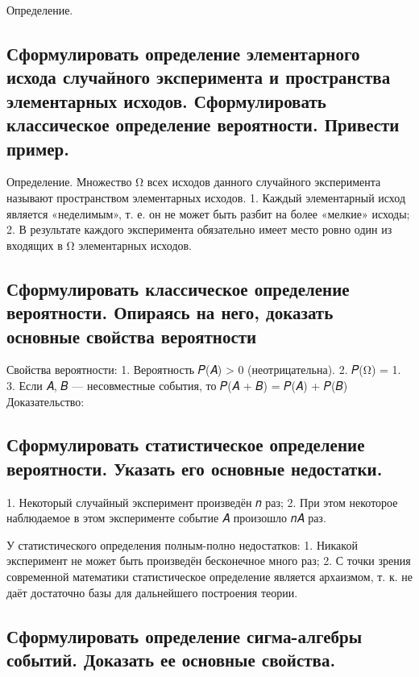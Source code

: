 Определение. 

\subsection{Сформулировать определение элементарного исхода случайного эксперимента и пространства элементарных исходов. Сформулировать классическое определение вероятности. Привести пример.}

Определение. Множество Ω всех исходов данного случайного эксперимента называют пространством элементарных исходов. 
1. Каждый элементарный исход является «неделимым», т. е. он не может быть разбит на более «мелкие» исходы; 
2. В результате каждого эксперимента обязательно имеет место ровно один из входящих в Ω элементарных исходов.

\subsection{Сформулировать классическое определение вероятности. Опираясь на него, доказать основные свойства вероятности}

Свойства вероятности:
1. Вероятность 𝑃(𝐴) > 0 (неотрицательна). 
2. 𝑃(Ω) = 1. 
3. Если 𝐴, 𝐵 — несовместные события, то 𝑃(𝐴 + 𝐵) = 𝑃(𝐴) + 𝑃(𝐵)
Доказательство:

\subsection{Сформулировать статистическое определение вероятности. Указать его основные недостатки.}

1. Некоторый случайный эксперимент произведён 𝑛 раз; 
2. При этом некоторое наблюдаемое в этом эксперименте событие 𝐴 произошло 𝑛𝐴 раз.

У статистического определения полным-полно недостатков:
1. Никакой эксперимент не может быть произведён бесконечное много раз;
2. С точки зрения современной математики статистическое определение является архаизмом, т. к. не даёт достаточно базы для дальнейшего построения теории.

\subsection{Сформулировать определение сигма-алгебры событий. Доказать ее основные свойства.}

